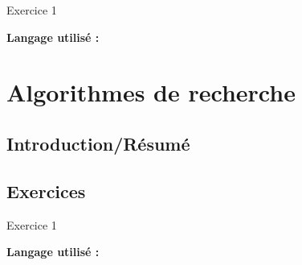     
\begin{Exercice}[Durée] Exercice 1\\

\begin{conseil}
\end{conseil}
    
\begin{solution}
\textbf{Langage utilisé :}
    
\end{solution}

\end{Exercice}

\section{Algorithmes de recherche}

\subsection{Introduction/Résumé}

\subsection{Exercices}

\begin{Exercice}[Durée] Exercice 1\\

\begin{conseil}
\end{conseil}
    
\begin{solution}
\textbf{Langage utilisé :}
    
\end{solution}

\end{Exercice}



